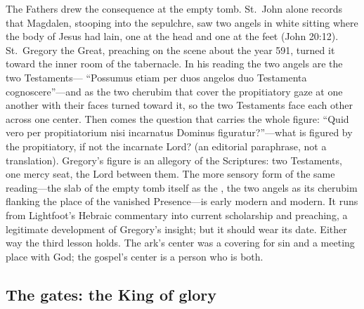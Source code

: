 The Fathers drew the consequence at the empty tomb. St.~John alone
records that Magdalen, stooping into the sepulchre, saw two angels in
white sitting where the body of Jesus had lain, one at the head and one
at the feet (John 20:12). St.~Gregory the Great, preaching on the
scene about the year 591, turned it toward the inner room of the
tabernacle. In his reading the two angels are the two Testaments---
``Possumus etiam per duos angelos duo Testamenta cognoscere''---and as
the two cherubim that cover the propitiatory gaze at one another with
their faces turned toward it, so the two Testaments face each other
across one center. Then comes the question that carries the whole
figure: ``Quid vero per propitiatorium nisi incarnatus Dominus
figuratur?''---what is figured by the propitiatory, if not the
incarnate Lord? (an editorial paraphrase, not a
translation).
Gregory's figure is an allegory of the Scriptures: two Testaments, one
mercy seat, the Lord between them. The more sensory form of the same
reading---the slab of the empty tomb itself as the ,
the two angels as its cherubim flanking the place of the vanished
Presence---is early modern and modern. It runs from Lightfoot's Hebraic
commentary into current scholarship and preaching, a legitimate
development of Gregory's insight; but it should wear its
date.
Either way the third lesson holds. The ark's center was a covering for
sin and a meeting place with God; the gospel's center is a person who
is both.

\subsection{The gates: the King of glory}

